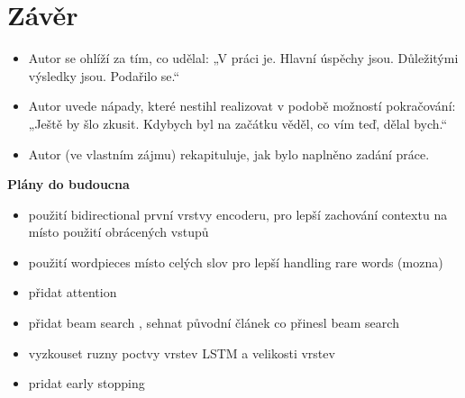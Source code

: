 \chapter{Závěr}
\begin{itemize}
  \item Autor se ohlíží za tím, co udělal: „V práci je. Hlavní úspěchy jsou. Důležitými výsledky jsou. Podařilo se.“
  \item Autor uvede nápady, které nestihl realizovat v podobě možností pokračování: „Ještě by šlo zkusit. Kdybych byl na začátku věděl, co vím teď, dělal bych.“
  \item Autor (ve vlastním zájmu) rekapituluje, jak bylo naplněno zadání práce.
\end{itemize}

\textbf{Plány do budoucna}
\begin{itemize}
    \item použití bidirectional první vrstvy encoderu, pro lepší zachování contextu \cite{googleBridgingGap} na místo použití obrácených vstupů
    \item použití wordpieces \cite{googleBridgingGap} místo celých slov pro lepší handling rare words (mozna)
    \item přidat attention \cite{attention}
    \item přidat beam search \cite{nmtTutorial}, sehnat původní článek co přinesl beam search
    \item vyzkouset ruzny poctvy vrstev LSTM a velikosti vrstev
    \item pridat early stopping
\end{itemize}
